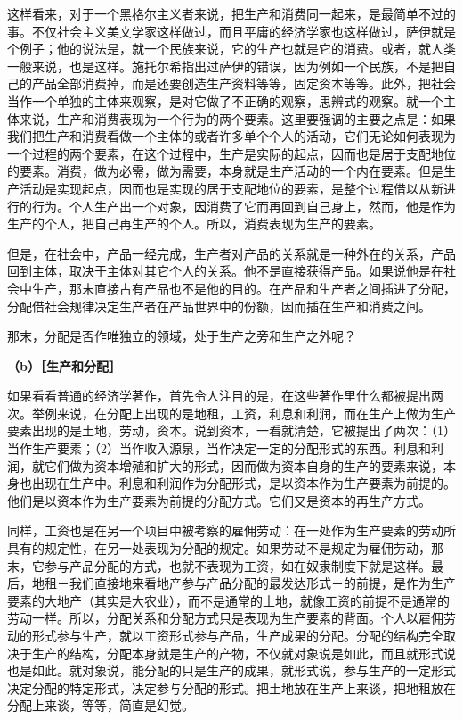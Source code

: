 \documentclass[a4paper,twoside,12pt,AutoFakeBold]{ctexart}
\begin{document}
这样看来，对于一个黑格尔主义者来说，把生产和消费同一起来，是最简单不过的事。不仅社会主义美文学家这样做过，而且平庸的经济学家也这样做过，萨伊就是个例子；他的说法是，就一个民族来说，它的生产也就是它的消费。或者，就人类一般来说，也是这样。施托尔希指出过萨伊的错误，因为例如一个民族，不是把自己的产品全部消费掉，而是还要创造生产资料等等，固定资本等等。此外，把社会当作一个单独的主体来观察，是对它做了不正确的观察，思辨式的观察。就一个主体来说，生产和消费表现为一个行为的两个要素。这里要强调的主要之点是：如果我们把生产和消费看做一个主体的或者许多单个个人的活动，它们无论如何表现为一个过程的两个要素，在这个过程中，生产是实际的起点，因而也是居于支配地位的要素。消费，做为必需，做为需要，本身就是生产活动的一个内在要素。但是生产活动是实现起点，因而也是实现的居于支配地位的要素，是整个过程借以从新进行的行为。个人生产出一个对象，因消费了它而再回到自己身上，然而，他是作为生产的个人，把自己再生产的个人。所以，消费表现为生产的要素。

但是，在社会中，产品一经完成，生产者对产品的关系就是一种外在的关系，产品回到主体，取决于主体对其它个人的关系。他不是直接获得产品。如果说他是在社会中生产，那末直接占有产品也不是他的目的。在产品和生产者之间插进了分配，分配借社会规律决定生产者在产品世界中的份额，因而插在生产和消费之间。

那末，分配是否作唯独立的领域，处于生产之旁和生产之外呢？

\textbf{（b）［生产和分配］}

如果看看普通的经济学著作，首先令人注目的是，在这些著作里什么都被提出两次。举例来说，在分配上出现的是地租，工资，利息和利润，而在生产上做为生产要素出现的是土地，劳动，资本。说到资本，一看就清楚，它被提出了两次：（1）当作生产要素；（2）当作收入源泉，当作决定一定的分配形式的东西。利息和利润，就它们做为资本增殖和扩大的形式，因而做为资本自身的生产的要素来说，本身也出现在生产中。利息和利润作为分配形式，是以资本作为生产要素为前提的。他们是以资本作为生产要素为前提的分配方式。它们又是资本的再生产方式。

同样，工资也是在另一个项目中被考察的雇佣劳动：在一处作为生产要素的劳动所具有的规定性，在另一处表现为分配的规定。如果劳动不是规定为雇佣劳动，那末，它参与产品分配的方式，也就不表现为工资，如在奴隶制度下就是这样。最后，地租－我们直接地来看地产参与产品分配的最发达形式－的前提，是作为生产要素的大地产（其实是大农业），而不是通常的土地，就像工资的前提不是通常的劳动一样。所以，分配关系和分配方式只是表现为生产要素的背面。个人以雇佣劳动的形式参与生产，就以工资形式参与产品，生产成果的分配。分配的结构完全取决于生产的结构，分配本身就是生产的产物，不仅就对象说是如此，而且就形式说也是如此。就对象说，能分配的只是生产的成果，就形式说，参与生产的一定形式决定分配的特定形式，决定参与分配的形式。把土地放在生产上来谈，把地租放在分配上来谈，等等，简直是幻觉。
\end{document}
